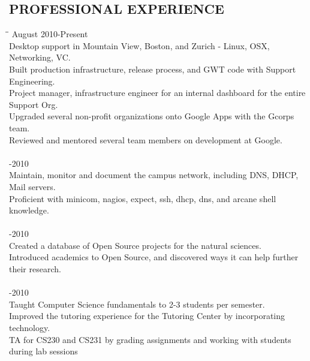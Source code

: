 \documentclass{res}
\begin{document}
\begin{resume}
\section{PROFESSIONAL EXPERIENCE}
  \vspace{-5pt}
  \begin{tabbing}
  \hspace{2.5in}\= \hspace{3.45in}\= \kill %
  \hspace{-0.25in}{\bf Internal Technology Resident, Google } \> \> \hspace{-0.65in}August 2010-Present\\
    Desktop support in Mountain View, Boston, and Zurich - Linux, OSX, Networking, VC.\\
    Built production infrastructure, release process, and GWT code with Support Engineering.\\
    Project manager, infrastructure engineer for an internal dashboard for the entire Support Org.\\
    Upgraded several non-profit organizations onto Google Apps with the Gcorps team.\\
    Reviewed and mentored several team members on development at Google.\\
\\
  \hspace{-0.25in}{\bf Student Network + Systems Admin, Chapman University IS\&T} \> -2010\\
    Maintain, monitor and document the campus network, including DNS, DHCP, Mail servers.\\
    Proficient with minicom, nagios, expect, ssh, dhcp, dns, and arcane shell knowledge.\\
\\
  \hspace{-0.25in}{\bf Student Researcher, Chapman University CS Department} \>    -2010\\
    Created a database of Open Source projects for the natural sciences. \\
    Introduced academics to Open Source, and discovered ways it can help further their research.\\
\\
  \hspace{-0.25in}{\bf Math/Computer Science Tutor, Chapman University Center for Academic Success} \> -2010\\
    Taught Computer Science fundamentals to 2-3 students per semester.\\
    Improved the tutoring experience for the Tutoring Center by incorporating technology.\\
    TA for CS230 and CS231 by grading assignments and working with students during lab sessions\\
  \end{tabbing}
  \vspace{-0.4in}


\end{resume}
\end{document}
